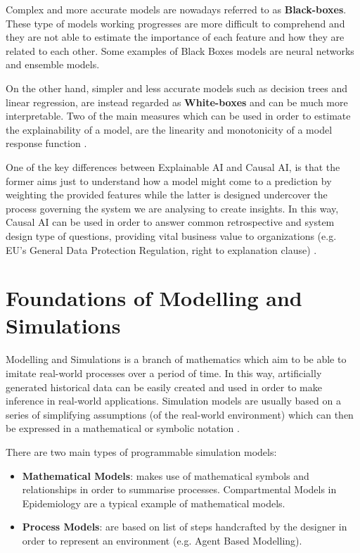 Complex and more accurate models are nowadays referred to as \textbf{Black-boxes}. These type of models working progresses are more difficult to comprehend and they are not able to estimate the importance of each feature and how they are related to each other. Some examples of Black Boxes models are neural networks and ensemble models.

On the other hand, simpler and less accurate models such as decision trees and linear regression, are instead regarded as \textbf{White-boxes} and can be much more interpretable. Two of the main measures which can be used in order to estimate the explainability of a model, are the linearity and monotonicity of a model response function \cite{nove}.

One of the key differences between Explainable AI and Causal AI, is that the former aims just to understand how a model might come to a prediction by weighting the provided features while the latter is designed undercover the process governing the system we are analysing to create insights. In this way, Causal AI can be used in order to answer common retrospective and system design type of questions, providing vital business value to organizations (e.g. EU’s General Data Protection Regulation, right to explanation clause) \cite{causalens}.

\section{Foundations of Modelling and Simulations}
Modelling and Simulations is a branch of mathematics which aim to be able to imitate real-world processes over a period of time. In this way, artificially generated historical data can be easily created and used in order to make inference in real-world applications. Simulation models are usually based on a series of simplifying assumptions (of the real-world environment) which can then be expressed in a mathematical or symbolic notation \cite{mod_1}. 

There are two main types of programmable simulation models:
\begin{itemize}
    \item \textbf{Mathematical Models}: makes use of mathematical symbols and relationships in order to summarise processes. Compartmental Models in Epidemiology are a typical example of mathematical models.
    \item \textbf{Process Models}: are based on list of steps handcrafted by the designer in order to represent an environment (e.g. Agent Based Modelling).
\end{itemize}

